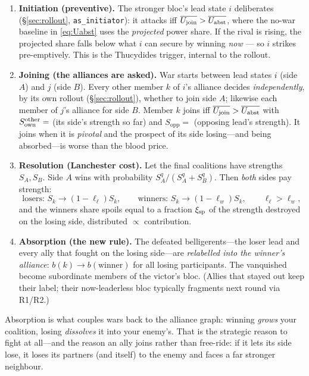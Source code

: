 \documentclass[11pt]{article}
\newcommand{\Sopp}{S_{\mathrm{opp}}}
\begin{document}
\begin{enumerate}
\item \textbf{Initiation (preventive).} The stronger bloc's lead state $i$
  deliberates (\S\ref{sec:rollout}, \texttt{as\_initiator}): it attacks iff
  $\overline{U_{\rm join}}>\overline{U_{\rm abst}}$, where the no-war baseline in
  \eqref{eq:Uabst} uses the \emph{projected} power share. If the rival is rising,
  the projected share falls below what $i$ can secure by winning \emph{now} ---
  so $i$ strikes pre-emptively. This is the Thucydides trigger, internal to the
  rollout.
\item \textbf{Joining (the alliances are asked).} War starts between lead states
  $i$ (side $A$) and $j$ (side $B$). Every other member $k$ of $i$'s alliance
  decides \emph{independently}, by its own rollout (\S\ref{sec:rollout}), whether
  to join side $A$; likewise each member of $j$'s alliance for side $B$. Member
  $k$ joins iff $\overline{U_{\rm join}}>\overline{U_{\rm abst}}$ with
  $S_{\rm own}^{\rm other}=$ (its side's strength so far) and $\Sopp=$ (opposing
  lead's strength). It joins when it is \emph{pivotal} and the prospect of its
  side losing---and being absorbed---is worse than the blood price.
\item \textbf{Resolution (Lanchester cost).} Let the final coalitions have
  strengths $S_A,S_B$. Side $A$ wins with probability
  $S_A^{q}/(S_A^{q}+S_B^{q})$. Then \emph{both} sides pay strength:
  \begin{equation}
  \text{losers: } S_k\!\to\!(1-\ell_\ell)S_k,\qquad
  \text{winners: } S_k\!\to\!(1-\ell_w)S_k,\qquad \ell_\ell>\ell_w,
  \end{equation}
  and the winners share spoils equal to a fraction $\xi_{\rm sp}$ of the strength
  destroyed on the losing side, distributed $\propto$ contribution.
\item \textbf{Absorption (the new rule).} The defeated belligerents---the loser
  lead and every ally that fought on the losing side---are \emph{relabelled into
  the winner's alliance}: $b(k)\!\to\!b(\text{winner})$ for all losing
  participants. The vanquished become subordinate members of the victor's bloc.
  (Allies that stayed out keep their label; their now-leaderless bloc typically
  fragments next round via R1/R2.)
\end{enumerate}

\noindent Absorption is what couples wars back to the alliance graph: winning
\emph{grows} your coalition, losing \emph{dissolves} it into your enemy's. That
is the strategic reason to fight at all---and the reason an ally joins rather
than free-ride: if it lets its side lose, it loses its partners (and itself) to
the enemy and faces a far stronger neighbour.
\end{document}
